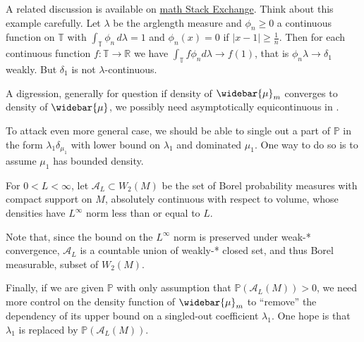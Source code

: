 A related discussion is available on
\href{https://math.stackexchange.com/questions/574130/does-weak-convergence-with-uniformly-bounded-densities-imply-absolute-continuity/574888#574888}{math Stack Exchange}.
Think about this example carefully.
Let $\lambda$ be the arglength measure and $\phi_n \ge 0$ a continuous function on $\mathbb T$ with $\int_{\mathbb T} \phi_n\, d\lambda = 1$ and $\phi_n(x) = 0$ if $|x-1| \ge \frac 1n$. Then for each continuous function $f\colon \mathbb T \to \mathbb R$ we have $\int_{\mathbb T} f\phi_n d\lambda \to f(1)$, that is $\phi_n \lambda \to \delta_1$ weakly. But $\delta_1$ is not $\lambda$-continuous.

A digression, generally for question if density of $\widebar{\mu}_m$ converges to density of $\widebar{\mu}$,
we possibly need asymptotically equicontinuous in \cite{Sweeting1986Converse}.

To attack even more general case,
we should be able to single out a part of $\mathbb{P}$ in the form $\lambda_1 \delta_{\mu_1}$
with lower bound on $\lambda_1$ and dominated $\mu_1$.
One way to do so is to assume $\mu_1$ has bounded density.
\begin{defn}
	For \( 0 < L < \infty \), let \( \mathcal { A } _ { L } \subset W_2(M) \) be the set of Borel probability
	measures with compact support on \( M \), absolutely continuous with respect to volume, whose densities have \( L ^ { \infty } \)
	norm less than or equal to \( L\).
\end{defn}

Note that, since the bound on the \( L ^ { \infty } \) norm is preserved under weak-* convergence,
\( \mathcal { A } _ { L } \) is a countable union of weakly-* closed set, and thus Borel measurable, subset of \( W_2( M ) \).


Finally, if we are given $\mathbb{P}$ with only assumption that $\mathbb{P}(\mathcal{A}_L(M)) > 0$,
we need more control on the density function of $\widebar{\mu}_m$
to ``remove'' the dependency of its upper bound on a singled-out coefficient $\lambda_1$.
One hope is that $\lambda_1$ is replaced by $\mathbb{P}(\mathcal{A}_L(M))$.


